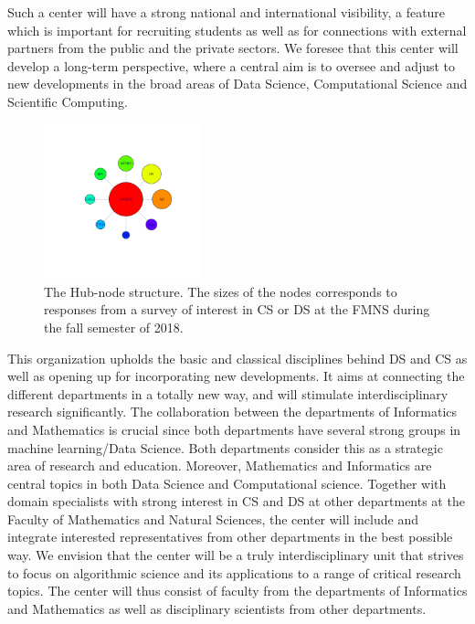 \documentclass[a4paper,10pt]{article}
\begin{document}
 Such a center will have a strong national and international visibility, a feature which is important for recruiting students as well as for  connections with external partners from the public and the private sectors. We foresee that this center will develop a long-term perspective, where a central aim is to oversee and adjust  to new developments in the broad areas of Data Science, Computational Science and Scientific Computing.



\begin{figure}
\centering
\includegraphics[width=0.4\textwidth,trim={2.4cm 4.4cm 1.8cm 3.64cm},clip]{Hub_node.pdf}
\caption{\label{fig:dept1}The Hub-node structure. The sizes of the nodes corresponds to responses from a survey of interest in CS or DS at the FMNS during the  fall semester of 2018.}
\end{figure}

This organization upholds the basic and classical disciplines behind DS and CS as well as  opening up for incorporating  new developments. It aims at connecting the different departments in a totally new way, and will stimulate interdisciplinary research significantly. The collaboration between the departments of Informatics and Mathematics is crucial since both departments have several strong groups in machine learning/Data Science. Both departments consider this as a strategic area of research and education. Moreover, Mathematics and Informatics are central topics in both Data Science and Computational science. Together with domain specialists with strong interest in CS and DS at other departments at the Faculty of Mathematics and Natural Sciences, the center will include and integrate interested representatives from other departments  in the best possible way. We envision that the center will be a truly interdisciplinary unit that strives to focus on algorithmic science and its applications to a range of critical research topics. The center will thus consist of  faculty from the departments of Informatics and Mathematics as well as disciplinary scientists from other departments. 
\end{document}

